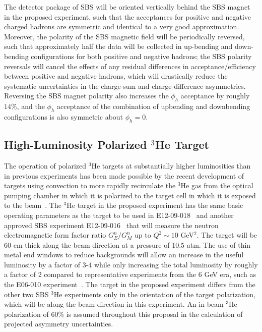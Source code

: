 The detector package of SBS will be oriented vertically behind the SBS magnet in the proposed experiment, such that the acceptances for positive and negative charged hadrons are symmetric and identical to a very good approximation. Moreover, the polarity of the SBS magnetic field will be periodically reversed, such that approximately half the data will be collected in up-bending and down-bending configurations for both positive and negative hadrons; the SBS polarity reversals will cancel the effects of any residual differences in acceptance/efficiency between positive and negative hadrons, which will drastically reduce the systematic uncertainties in the charge-sum and charge-difference asymmetries. Reversing the SBS magnet polarity also increases the $\phi_h$ acceptance by roughly $14\%$, and the $\phi_h$ acceptance of the combination of upbending and downbending configurations is also symmetric about $\phi_h = 0$. 
\subsection{High-Luminosity Polarized $^3$He Target}

The operation of polarized $^3$He targets at substantially higher luminosities than in previous experiments has been made possible by the recent development of targets using convection to more rapidly recirculate the $^3$He gas from the optical pumping chamber in which it is polarized to the target cell in which it is exposed to the beam~\cite{Helium3_target}. The $^3$He target in the proposed experiment has the same basic operating parameters as the target to be used in E12-09-018~\cite{SBS_SIDIS} and another approved SBS experiment E12-09-016~\cite{GEN2} that will measure the neutron electromagnetic form factor ratio $G_E^n/G_M^n$ up to $Q^2 \sim 10$ GeV$^2$. The target will be 60 cm thick along the beam direction at a pressure of 10.5 atm. The use of thin metal end windows to reduce backgrounds will allow an increase in the useful luminosity by a factor of 3-4 while only increasing the total luminosity by roughly a factor of 2 compared to representative experiments from the 6 GeV era, such as the E06-010 experiment~\cite{E06010_AUT_PRL}. The target in the proposed experiment differs from the other two SBS $^3$He experiments only in the orientation of the target polarization, which will be along the beam direction in this experiment. An in-beam $^3$He  polarization of 60\% is assumed throughout this proposal in the calculation of projected asymmetry uncertainties. 

